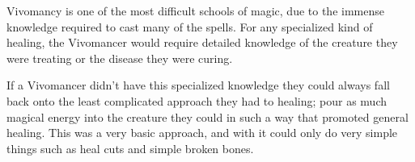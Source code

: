 \documentclass{article}
\begin{document}
Vivomancy is one of the most difficult schools of magic, due to the immense knowledge required to cast many of the spells. For any specialized kind of healing, the Vivomancer would require detailed knowledge of the creature they were treating or the disease they were curing.

If a Vivomancer didn't have this specialized knowledge they could always fall back onto the least complicated approach they had to healing; pour as much magical energy into the creature they could in such a way that promoted general healing. This was a very basic approach, and with it could only do very simple things such as heal cuts and simple broken bones.
\end{document}
